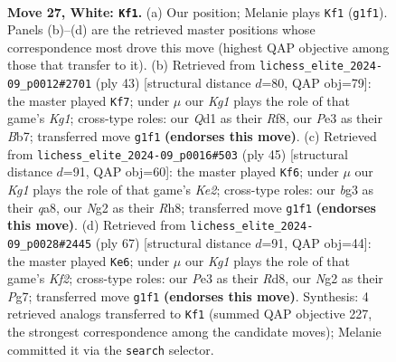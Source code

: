 \documentclass[11pt]{article}
\begin{document}
\clearpage

\begin{figure}[p]\centering
\begin{subfigure}{0.46\textwidth}\centering
\resizebox{\linewidth}{!}{%
\newchessgame
\chessboard[
  setfen={r6r/3nk2p/1pp1p1p1/8/1p1P3P/P3PRb1/RP4Nq/2BQ2K1 w - - 5 27},
  showmover=false,
  pgfstyle=straightmove, color=movearrow, markmove={g1-f1}
]}
\caption{}
\end{subfigure}\hfill
\begin{subfigure}{0.46\textwidth}\centering
\resizebox{\linewidth}{!}{%
\newchessgame
\chessboard[
  setfen={4rrk1/pbq3pQ/1p2p3/3p4/5p2/2Pn2BR/PP1N2PP/5RK1 b - - 3 22},
  showmover=false,
  pgfstyle=straightmove, color=movearrow, markmove={g8-f7}
]}
\caption{}
\end{subfigure}
\\[4pt]
\begin{subfigure}{0.46\textwidth}\centering
\resizebox{\linewidth}{!}{%
\newchessgame
\chessboard[
  setfen={Q6r/p1rnkbq1/2p1p3/5N1p/2pP2p1/6P1/PP3PBP/R3R1K1 b - - 0 23},
  showmover=false,
  pgfstyle=straightmove, color=movearrow, markmove={e7-f6}
]}
\caption{}
\end{subfigure}\hfill
\begin{subfigure}{0.46\textwidth}\centering
\resizebox{\linewidth}{!}{%
\newchessgame
\chessboard[
  setfen={3r4/2q2kpQ/1p3r1p/p1b1p2B/5P1P/4p1PK/PP6/5R1R b - - 3 34},
  showmover=false,
  pgfstyle=straightmove, color=movearrow, markmove={f7-e6}
]}
\caption{}
\end{subfigure}
\caption{\textbf{Move 27, White: \texttt{Kf1}.} (a) Our position; Melanie plays \texttt{Kf1} (\texttt{g1f1}). Panels (b)--(d) are the retrieved master positions whose correspondence most drove this move (highest QAP objective among those that transfer to it). (b) Retrieved from \texttt{lichess\_elite\_2024-09\_p0012\#2701} (ply 43) [structural distance $d$=80, QAP obj=79]: the master played \texttt{Kf7}; under $\mu$ our \emph{Kg1} plays the role of that game's \emph{Kg1}; cross-type roles: our \emph{Q}d1 as their \emph{R}f8, our \emph{P}e3 as their \emph{B}b7; transferred move \texttt{g1f1} \textbf{(endorses this move)}. (c) Retrieved from \texttt{lichess\_elite\_2024-09\_p0016\#503} (ply 45) [structural distance $d$=91, QAP obj=60]: the master played \texttt{Kf6}; under $\mu$ our \emph{Kg1} plays the role of that game's \emph{Ke2}; cross-type roles: our \emph{b}g3 as their \emph{q}a8, our \emph{N}g2 as their \emph{R}h8; transferred move \texttt{g1f1} \textbf{(endorses this move)}. (d) Retrieved from \texttt{lichess\_elite\_2024-09\_p0028\#2445} (ply 67) [structural distance $d$=91, QAP obj=44]: the master played \texttt{Ke6}; under $\mu$ our \emph{Kg1} plays the role of that game's \emph{Kf2}; cross-type roles: our \emph{P}e3 as their \emph{R}d8, our \emph{N}g2 as their \emph{P}g7; transferred move \texttt{g1f1} \textbf{(endorses this move)}. Synthesis: 4 retrieved analogs transferred to \texttt{Kf1} (summed QAP objective 227, the strongest correspondence among the candidate moves); Melanie committed it via the \texttt{search} selector.}
\label{fig:thought-m52}
\end{figure}
\end{document}
